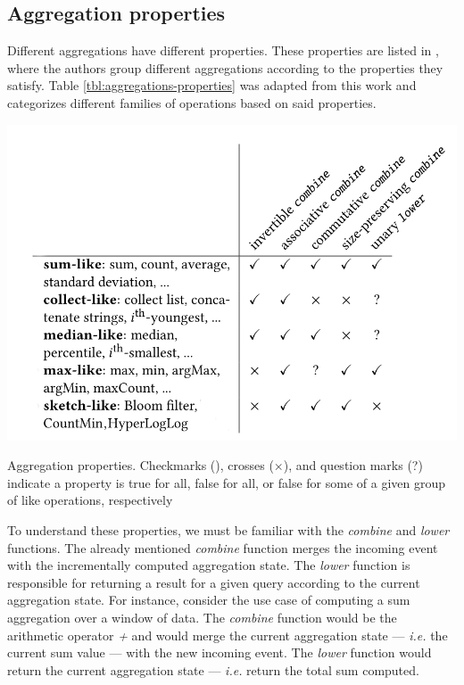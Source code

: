 \subsection{Aggregation properties}

Different aggregations have different properties. These properties are listed in \cite{Tangwongsan-Sliding-Window-Aggregation-Algorithms}, where the authors group different aggregations according to the properties they satisfy. Table \ref{tbl:aggregations-properties} was adapted from this work and categorizes different families of operations based on said properties.

\begin{table}[!htb]
    \begin{center}
      \includegraphics[scale=0.5]{figures/aggregation-operations-properties.png}
      \caption[Aggregation properties]{Aggregation properties. Checkmarks (\checkmark), crosses ($\times$), and question marks (?) indicate a property is true for all, false for all, or false for some of a given group of like operations, respectively}
      \label{tbl:aggregations-properties}
    \end{center}
\end{table}

To understand these properties, we must be familiar with the \textit{combine} and \textit{lower} functions. The already mentioned \textit{combine} function merges the incoming event with the incrementally computed aggregation state. The \textit{lower} function is responsible for returning a result for a given query according to the current aggregation state. For instance, consider the use case of computing a sum aggregation over a window of data. The \textit{combine} function would be the arithmetic operator \textit{+} and would merge the current aggregation state --- \textit{i.e.} the current sum value --- with the new incoming event. The \textit{lower} function would return the current aggregation state --- \textit{i.e.} return the total sum computed.

